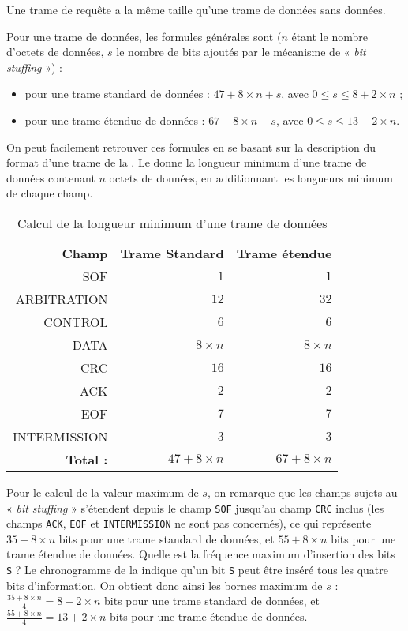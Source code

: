 Une trame de requête a la même taille qu'une trame de données sans données.

Pour une trame de données, les formules générales sont ($n$ étant le nombre d'octets de données, $s$ le nombre de bits ajoutés par le mécanisme de « \emph{bit stuffing} ») :
\begin{itemize}
  \item pour une trame standard de données : $47 + 8 \times n + s$, avec $0 \leqslant s \leqslant 8 + 2 \times n$ ;
  \item pour une trame étendue de données : $67 + 8 \times n + s$, avec $0 \leqslant s \leqslant 13 + 2 \times n$.
\end{itemize}

On peut facilement retrouver ces formules en se basant sur la description du format d'une trame de la . Le  donne la longueur minimum d'une trame de données contenant $n$ octets de données, en additionnant les longueurs minimum de chaque champ.





\begin{table}[!t]
  \small
  \centering
  \begin{tabular}{rrr}
    \textbf{Champ}& \textbf{Trame Standard} & \textbf{Trame étendue} \\
    SOF & $1$ & $1$ \\
    ARBITRATION & $12$ & $32$ \\
    CONTROL & $6$ & $6$ \\
    DATA & $8\times n$ & $8\times n$ \\
    CRC & $16$ & $16$ \\
    ACK & $2$ & $2$ \\
    EOF & $7$ & $7$ \\
    INTERMISSION & $3$ & $3$ \\
    {\bf Total :} & $47 + 8\times n$ & $67 + 8\times n$ \\
   \end{tabular}
  \caption{Calcul de la longueur minimum d'une trame de données}
  \ligne
\end{table}

Pour le calcul de la valeur maximum de $s$, on remarque que les champs sujets au « \emph{bit stuffing} » s'étendent depuis le champ \texttt{SOF} jusqu'au champ \texttt{CRC} inclus (les champs \texttt{ACK}, \texttt{EOF} et \texttt{INTERMISSION} ne sont pas concernés), ce qui représente $35 + 8 \times n$ bits pour une trame standard de données, et $55 + 8 \times n$ bits pour une trame étendue de données. Quelle est la fréquence maximum d'insertion des bits \texttt{S} ? Le chronogramme de la  indique qu'un bit \texttt{S} peut être inséré tous les quatre bits d'information. On obtient donc ainsi les bornes maximum de $s$ : $\frac{35 + 8 \times n}{4} = 8 + 2 \times n$ bits pour une trame standard de données, et $\frac{55 + 8 \times n}{4} = 13 + 2 \times n$ bits pour une trame étendue de données.

